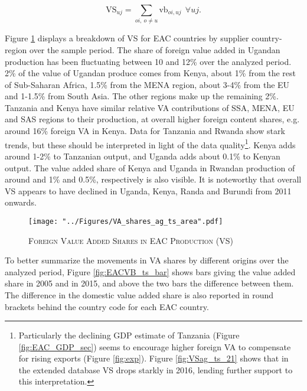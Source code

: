 \documentclass[a4paper]{article}
\begin{document}
\begin{equation} \label{eq:VS}
\text{VS}_{uj} = \sum_{oi,\ o \neq  u} \text{vb}_{oi, uj}\ \ \forall uj.
\end{equation}

Figure \ref{fig:EACVB_ts} displays a breakdown of VS for EAC countries by supplier country-region over the sample period. The share of foreign value added in Ugandan production has been fluctuating between 10 and 12\% over the analyzed period. 2\% of the value of Ugandan produce comes from Kenya, about 1\% from the rest of Sub-Saharan Africa, 1.5\% from the MENA region, about 3-4\% from the EU and 1-1.5\% from South Asia. The other regions make up the remaining 2\%. Tanzania and Kenya have similar relative VA contributions of SSA, MENA, EU and SAS regions to their production, at overall higher foreign content shares, e.g. around 16\% foreign VA in Kenya. Data for Tanzania and Rwanda show stark trends, but these should be interpreted in light of the data quality\footnote{Particularly the declining GDP estimate of Tanzania (Figure \ref{fig:EAC_GDP_sec}) seems to encourage higher foreign VA to compensate for rising exports (Figure \ref{fig:exp}). Figure \ref{fig:VSag_ts_21} shows that in the extended database VS drops starkly in 2016, lending further support to this interpretation.}. Kenya adds around 1-2\% to Tanzanian output, and Uganda adds about 0.1\% to Kenyan output. The value added share of Kenya and Uganda in Rwandan production of around and 1\% and 0.5\%, respectively is also visible. It is noteworthy that overall VS appears to have declined in Uganda, Kenya, Randa and Burundi from 2011 onwards. %

\begin{figure}[h!]
\centering
\caption{\label{fig:EACVB_ts}\textsc{Foreign Value Added Shares in EAC Production (VS)}}
\texttt{[image: "../Figures/VA\_shares\_ag\_ts\_area".pdf]} %
\vspace{-0.5cm}
\end{figure}
\FloatBarrier


To better summarize the movements in VA shares by different origins over the analyzed period, Figure \ref{fig:EACVB_ts_bar} shows  bars giving the value added share in 2005 and in 2015, and above the two bars the difference between them. The difference in the domestic value added share is also reported in round brackets behind the country code for each EAC country.
\end{document}
